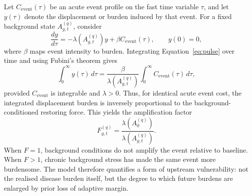 Let $C_{\mathrm{event}}(\tau)$ be an acute event profile on the fast time variable $\tau$, and let $y(\tau)$ denote the displacement or burden induced by that event. For a fixed background state $A_{g,t}^{(q)}$, consider
\begin{equation}
  \frac{dy}{d\tau} = -\lambda(A^{(q)}_{g,t})y + \beta C_{\mathrm{event}}(\tau),
  \qquad y(0)=0,
  \label{eq:pulse}
\end{equation}
where $\beta$ maps event intensity to burden. Integrating Equation~\eqref{eq:pulse} over time and using Fubini's theorem gives
\begin{equation}
  \int_0^\infty y(\tau)\,d\tau
  = \frac{\beta}{\lambda(A^{(q)}_{g,t})}
    \int_0^\infty C_{\mathrm{event}}(\tau)\,d\tau,
  \label{eq:auc}
\end{equation}
provided $C_{\mathrm{event}}$ is integrable and $\lambda>0$. Thus, for identical acute event cost, the integrated displacement burden is inversely proportional to the background-conditioned restoring force. This yields the amplification factor
\begin{equation}
  F^{(q)}_{g,t}=\frac{\lambda(A^{(q)}_0)}{\lambda(A^{(q)}_{g,t})}.
  \label{eq:F}
\end{equation}
When $F=1$, background conditions do not amplify the event relative to baseline. When $F>1$, chronic background stress has made the same event more burdensome. The model therefore quantifies a form of upstream vulnerability: not the realised disease burden itself, but the degree to which future burdens are enlarged by prior loss of adaptive margin.

